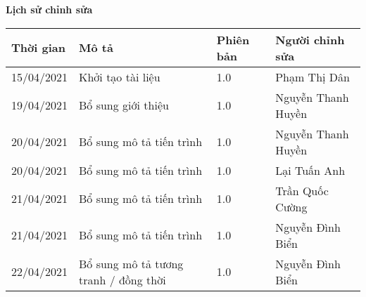 \documentclass[./main.tex]{subfiles}
\begin{document}
\begin{center}
	\Large{\textbf{Lịch sử chỉnh sửa}}
	\begin{table}[H]
		\begin{tabular}{|p{}|p{}|p{}|p{}|}
			\hline
			\textbf{Thời gian} & \textbf{Mô tả}                        & \textbf{Phiên bản} & \textbf{Người chỉnh sửa} \\ \hline
			15/04/2021         & Khởi tạo tài liệu                     & 1.0                & Phạm Thị Dân             \\ \hline
			19/04/2021         & Bổ sung giới thiệu                    & 1.0                & Nguyễn Thanh Huyền       \\ \hline
			20/04/2021         & Bổ sung mô tả tiến trình              & 1.0                & Nguyễn Thanh Huyền       \\ \hline
			20/04/2021         & Bổ sung mô tả tiến trình              & 1.0                & Lại Tuấn Anh             \\ \hline
			21/04/2021         & Bổ sung mô tả tiến trình              & 1.0                & Trần Quốc Cường          \\ \hline
			21/04/2021         & Bổ sung mô tả tiến trình              & 1.0                & Nguyễn Đình Biển         \\ \hline
			22/04/2021         & Bổ sung mô tả tương tranh / đồng thời & 1.0                & Nguyễn Đình Biển         \\ \hline
		\end{tabular}
	\end{table}
\end{center}
\end{document}
